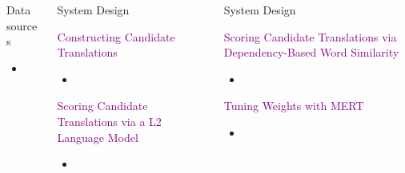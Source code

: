 \documentclass[final,t]{beamer}
\begin{document}
\begin{frame}{}
\begin{columns}[t]
\begin{column}{.31\linewidth}
\begin{block}{Data sources}
\colorbox{light-gray}{
\begin{minipage}{.90\linewidth}
\begin{itemize}
\item
\end{itemize}
\end{minipage}
}

\end{block}

\end{column}

\begin{column}{.64\linewidth}

\begin{columns}
\begin{column}{.48\linewidth}

\begin{block}{System Design}

\begin{center}
  \textcolor{purple}{Constructing Candidate Translations}
  \begin{itemize}
  \item 
  \end{itemize}

  \textcolor{purple}{Scoring Candidate Translations via a L2 Language Model}
  \begin{itemize}
  \item 
  \end{itemize}

\end{center}

\end{block}

\end{column}

\begin{column}{.48\linewidth}

\begin{block}{System Design}
\begin{center}

  \textcolor{purple}{Scoring Candidate Translations via Dependency-Based Word Similarity}
  \begin{itemize}
  \item 
  \end{itemize}

  \textcolor{purple}{Tuning Weights with MERT}
  \begin{itemize}
  \item 
  \end{itemize}


\end{center}
\end{block}
\end{column}
\end{columns}
\end{column}
\end{columns}
\end{frame}
\end{document}
